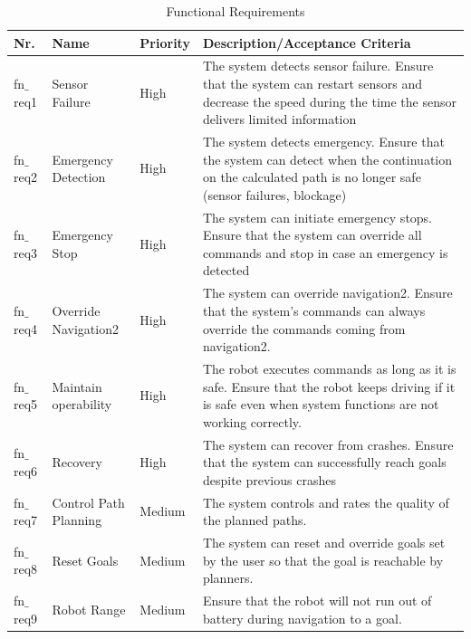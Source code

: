 \begin{table}[ht]
\caption{Functional Requirements}
\label{tab:fn_req}
	\begin{tabular}{| m{} | m{}| m{} | m{}|} 
  	\hline
  	\textbf{Nr.} & \textbf{Name} & \textbf{Priority} & \textbf{Description/Acceptance Criteria} \\ 
  	\hline
  	fn$\_$req1 & Sensor Failure & High & The system detects sensor failure. Ensure that the system can restart sensors and decrease the speed during the time the sensor delivers limited information \\ 
  	\hline
  	fn$\_$req2 & Emergency Detection & High & The system detects emergency. Ensure that the system can detect when the continuation on the calculated path is no longer safe (sensor failures, blockage) \\
  	\hline
  	fn$\_$req3 & Emergency Stop & High & The system can initiate emergency stops. Ensure that the system can override all commands and stop in case an emergency is detected \\
  	\hline  	
  	fn$\_$req4 & Override Navigation2 & High & The system can override navigation2. Ensure that the system's commands can always override the commands coming from navigation2. \\
  	\hline
  	fn$\_$req5 & Maintain operability & High & The robot executes commands as long as it is safe. Ensure that the robot keeps driving if it is safe even when system functions are not working correctly. \\
  	\hline
  	fn$\_$req6 & Recovery & High &  The system can recover from crashes. Ensure that the system can successfully reach goals despite previous crashes\\ 
  	\hline  
  	fn$\_$req7 & Control Path Planning & Medium & The system controls and rates the quality of the planned paths. \\
  	\hline	
  	fn$\_$req8 & Reset Goals & Medium & The system can reset and override goals set by the user so that the goal is reachable by planners. \\
  	\hline
  	fn$\_$req9 & Robot Range & Medium & Ensure that the robot will not run out of battery during navigation to a goal.  \\	
  	\hline
	\end{tabular}
\end{table}


